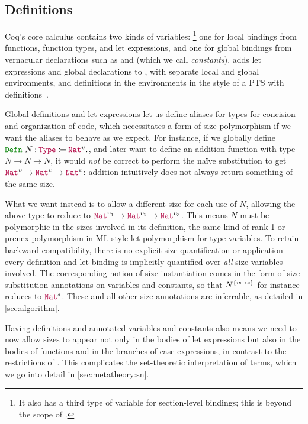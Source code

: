 \subsection{Definitions}

Coq's core calculus contains two kinds of variables:%
\footnote{It also has a third type of variable for section-level bindings;
this is beyond the scope of \lang.}
one for local bindings from functions, function types, and let expressions,
and one for global bindings from vernacular declarations such as  and  (which we call \textit{constants}).
\lang adds let expressions and global declarations to \CIChat,
with separate local and global environments,
and definitions in the environments in the style of a PTS with definitions~\citep[233--241]{pts}.

Global definitions and let expressions let us define aliases for types for concision and organization of code,
which necessitates a form of size polymorphism if we want the aliases to behave as we expect.
For instance, if we globally define $\Defn{N}{\Type{}}{\Nat^\upsilon}$,
and later want to define an addition function with type $N \rightarrow N \rightarrow N$,
it would \emph{not} be correct to perform the na\"ive substitution to get $\Nat^\upsilon \rightarrow \Nat^\upsilon \rightarrow \Nat^\upsilon$:
addition intuitively does not always return something of the same size.

What we want instead is to allow a different size for each use of $N$,
allowing the above type to reduce to $\Nat^{\upsilon_1} \rightarrow \Nat^{\upsilon_2} \rightarrow \Nat^{\upsilon_3}$.
This means $N$ must be polymorphic in the sizes involved in its definition,
the same kind of rank-1 or prenex polymorphism in ML-style let polymorphism for type variables.
To retain backward compatibility, there is no explicit size quantification or application ---
every definition and let binding is implicitly quantified over \emph{all} size variables involved.
The corresponding notion of size instantiation comes in the form of size substitution annotations on variables and constants, so that $N^{\{\upsilon \mapsto s\}}$ for instance reduces to $\Nat^s$.
These and all other size annotations are inferrable, as detailed in \autoref{sec:algorithm}.

Having definitions and annotated variables and constants also means we need to now allow sizes to appear
not only in the bodies of let expressions but also in the bodies of functions and in the branches of case expressions,
in contrast to the restrictions of \CIChatminus.
This complicates the set-theoretic interpretation of \lang terms,
which we go into detail in \autoref{sec:metatheory:sn}.

